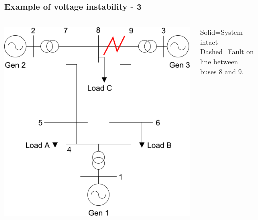 \documentclass{beamer}
\begin{document}
\begin{frame}[label=examplecont]
\frametitle{Example of voltage instability - 3}
\begin{columns}
\includegraphics[width=\textwidth]{Figs/Ieee9bus_fault89.pdf}

Solid=System intact\\
Dashed=Fault on line between buses 8 and 9.
\end{columns}
\end{frame}
\end{document}
